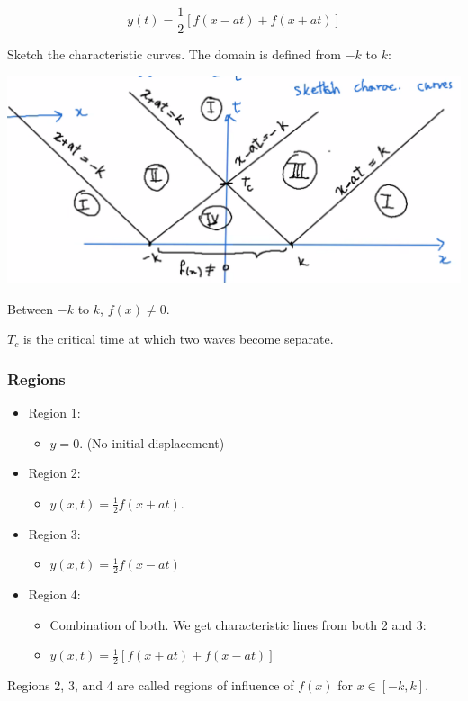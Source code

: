 \documentclass{article}
\begin{document}
$$y(t) = \frac{1}{2} \left[ f(x-at) + f(x+at) \right]$$

Sketch the characteristic curves. The domain is defined from $-k$ to $k$:

\includegraphics[width = 0.7 \textwidth]{image2.png}

Between $-k$ to $k$, $f(x) \neq 0$. 

$T_c$ is the critical time at which two waves become separate. 

\subsubsection{Regions}

\begin{itemize}
    \item Region 1:
    \begin{itemize}
        \item $y = 0$. (No initial displacement)
    \end{itemize}
    \item Region 2:
    \begin{itemize}
        \item $y(x,t) = \frac{1}{2} f(x+at)$. 
    \end{itemize}
    \item Region 3:
    \begin{itemize}
        \item $y(x,t) = \frac{1}{2} f(x-at)$
    \end{itemize}
    \item Region 4:
    \begin{itemize}
        \item Combination of both. We get characteristic lines from both 2 and 3:
        \item $y(x,t) = \frac{1}{2} \left[ f(x+at) + f(x-at) \right]$
    \end{itemize}
\end{itemize}

Regions 2, 3, and 4 are called regions of influence of $f(x)$ for $x \in [-k, k]$. 
\end{document}
